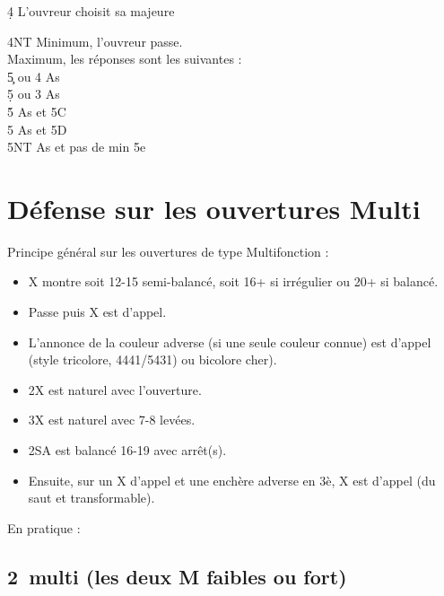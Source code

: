 \documentclass[a4paper]{article}
\begin{document}
\begin{bidtable}
4\d \> L'ouvreur choisit sa majeure
\end{bidtable}

\begin{bidtable}
4NT \> Minimum, l'ouvreur passe.\\
\>Maximum, les réponses sont les suivantes :\+\\
5\c {} ou 4 As\\
5\d {} ou 3 As\\
5\h {} As et 5C\\
5\s {} As et 5D\\
5NT  As et pas de min 5e\-
\end{bidtable}

\section{Défense sur les ouvertures Multi}

Principe général sur les ouvertures de type Multifonction :

\begin{itemize}
\item X montre soit 12-15 semi-balancé, soit 16+ si irrégulier ou 20+ si balancé.

\item Passe puis X est d'appel.

\item L'annonce de la couleur adverse (si une seule couleur connue) est d'appel (style tricolore, 4441/5431) ou bicolore cher).

\item 2X est naturel avec l'ouverture.

\item 3X est naturel avec 7-8 levées.

\item 2SA est balancé 16-19 avec arrêt(s).

\item Ensuite, sur un X d'appel et une enchère adverse en 3è, X est d'appel (du saut et transformable).

\end{itemize}

En pratique :

\subsection{2\pdfc\ multi (les deux M faibles ou fort)}
\end{document}
